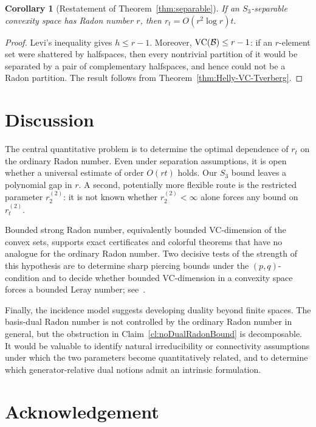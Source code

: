 \documentclass[11pt]{article}
\newtheorem{cor}[thm]{Corollary}
\theoremstyle{definition}
\newcommand{\B}{\mathcal{B}}
\newcommand{\VC}{\textup{VC}}
\begin{document}
\begin{cor}[Restatement of Theorem~\ref{thm:separable}]
If an $S_3$-separable convexity space has Radon number $r$, then
$r_t=O(r^2\log r)t.$
\end{cor}

\begin{proof}
Levi's inequality gives $h\le r-1$.  Moreover,
$\VC(\B)\le r-1$: if an $r$-element set were shattered by halfspaces,
then every nontrivial partition of it would be separated by a pair of
complementary halfspaces, and hence could not be a Radon partition.
The result follows from
Theorem~\ref{thm:Helly-VC-Tverberg}.
\end{proof}


\section{Discussion}\label{sec:discussion}
The central quantitative problem is to determine the optimal dependence of $r_t$ on the ordinary Radon number. Even under separation assumptions, it is open whether a universal estimate of order $O(rt)$ holds. Our $S_3$ bound leaves a polynomial gap in $r$. A second, potentially more flexible route is the restricted parameter $r_2^{(2)}$: it is not known whether $r_2^{(2)}<\infty$ alone forces any bound on $r_t^{(2)}$.

Bounded strong Radon number, equivalently bounded VC-dimension of the convex sets, supports exact certificates and colorful theorems that have no analogue for the ordinary Radon number. Two decisive tests of the strength of this hypothesis are to determine sharp piercing bounds under the $(p,q)$-condition and to decide whether bounded VC-dimension in a convexity space forces a bounded Leray number; see~\cite[Question~4.12]{pohoata2025colorful}.

Finally, the incidence model suggests developing duality beyond finite spaces. The basis-dual Radon number is not controlled by the ordinary Radon number in general, but the obstruction in Claim~\ref{cl:noDualRadonBound} is decomposable. It would be valuable to identify natural irreducibility or connectivity assumptions under which the two parameters become quantitatively related, and to determine which generator-relative dual notions admit an intrinsic formulation.

\section*{Acknowledgement}
\end{document}
